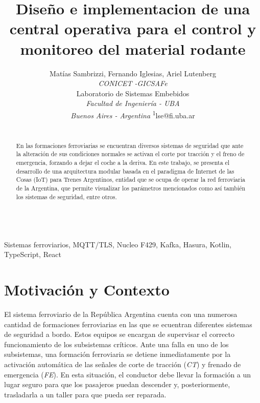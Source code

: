 \documentclass[a4paper]{IEEEtran}
\begin{document}
\title{Diseño e implementacion de una central operativa para el control y monitoreo del material rodante}



\author{

Matías Sambrizzi, 
Fernando Iglesias, 
Ariel Lutenberg \\

\normalsize \textit{CONICET -GICSAFe} \\
Laboratorio de Sistemas Embebidos \\
\textit{Facultad de Ingeniería - UBA} \\
\textit{Buenos Aires - Argentina}
\textsuperscript{1}\small lse@fi.uba.ar \\

}


\maketitle

\begin{abstract}
\\
En las formaciones ferroviarias se encuentran diversos sistemas de seguridad que ante la alteración de sus condiciones normales se activan el corte por tracción y el freno de emergencia, forzando a dejar el coche a la deriva. En este trabajo, se presenta el desarrollo de una arquitectura modular basada en el paradigma de Internet de las Cosas (IoT) para Trenes Argentinos, entidad que se ocupa de operar la red ferroviaria de la Argentina, que permite visualizar los parámetros mencionados como así también los sistemas de seguridad, entre otros.
\end{abstract}


\begin{IEEEkeywords}
\\
Sistemas ferroviarios, MQTT/TLS, Nucleo F429, Kafka, Hasura, Kotlin, TypeScript, React
\end{IEEEkeywords}


\section{Motivación y Contexto}

El sistema ferroviario de la República Argentina cuenta con una numerosa cantidad de formaciones ferroviarias en las que se ecuentran diferentes sistemas de seguridad a bordo. Estos equipos se encargan de supervisar el correcto funcionamiento de los subsistemas críticos. Ante una falla en uno de los subsistemas, una formación ferroviaria se detiene inmediatamente por la activación automática de las señales de corte de tracción (\textit{CT}) y frenado de emergencia (\textit{FE}). En esta situación, el conductor debe llevar la formación a un lugar seguro para que los pasajeros puedan descender y, posteriormente, trasladarla a un taller para que pueda ser reparada.
\\
\end{document}
